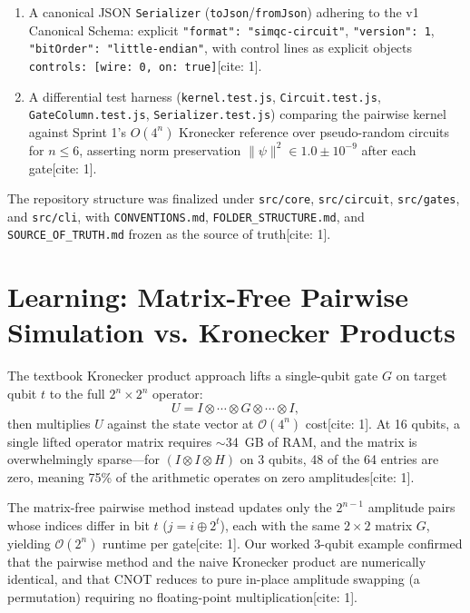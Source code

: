 \documentclass[conference]{IEEEtran}
\begin{document}
\begin{enumerate}
    \item A canonical JSON \texttt{Serializer} (\texttt{toJson}/\texttt{fromJson}) adhering to the v1 Canonical Schema: explicit \texttt{"format": "simqc-circuit"}, \texttt{"version": 1}, \texttt{"bitOrder": "little-endian"}, with control lines as explicit objects \texttt{controls: [{wire: 0, on: true}]}[cite: 1].

    \item A differential test harness (\texttt{kernel.test.js}, \texttt{Circuit.test.js}, \texttt{GateColumn.test.js}, \texttt{Serializer.test.js}) comparing the pairwise kernel against Sprint 1's $O(4^n)$ Kronecker reference over pseudo-random circuits for $n \le 6$, asserting norm preservation $\lVert\psi\rVert^2 \in 1.0 \pm 10^{-9}$ after each gate[cite: 1].
\end{enumerate}

The repository structure was finalized under \texttt{src/core}, \texttt{src/circuit}, \texttt{src/gates}, and \texttt{src/cli}, with \texttt{CONVENTIONS.md}, \texttt{FOLDER\_STRUCTURE.md}, and \texttt{SOURCE\_OF\_TRUTH.md} frozen as the source of truth[cite: 1].

\section{Learning: Matrix-Free Pairwise Simulation vs. Kronecker Products}
The textbook Kronecker product approach lifts a single-qubit gate $G$ on target qubit $t$ to the full $2^n \times 2^n$ operator:
\begin{equation}
    U = I \otimes \cdots \otimes G \otimes \cdots \otimes I,
\end{equation}
then multiplies $U$ against the state vector at $\mathcal{O}(4^n)$ cost[cite: 1]. At 16 qubits, a single lifted operator matrix requires $\sim$34~GB of RAM, and the matrix is overwhelmingly sparse---for $(I \otimes I \otimes H)$ on 3 qubits, 48 of the 64 entries are zero, meaning 75\% of the arithmetic operates on zero amplitudes[cite: 1].

The matrix-free pairwise method instead updates only the $2^{n-1}$ amplitude pairs whose indices differ in bit $t$ ($j = i \oplus 2^t$), each with the same $2\times2$ matrix $G$, yielding $\mathcal{O}(2^n)$ runtime per gate[cite: 1]. Our worked 3-qubit example confirmed that the pairwise method and the naive Kronecker product are numerically identical, and that CNOT reduces to pure in-place amplitude swapping (a permutation) requiring no floating-point multiplication[cite: 1].
\end{document}
